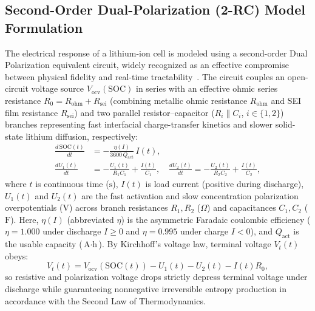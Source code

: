 \documentclass[10pt,a4paper]{article}
\begin{document}
\subsection{Second-Order Dual-Polarization (2-RC) Model Formulation}
The electrical response of a lithium-ion cell is modeled using a second-order Dual Polarization equivalent circuit, widely recognized as an effective compromise between physical fidelity and real-time tractability~\cite{Hu2012ecm,Xiong2014}. The circuit couples an open-circuit voltage source $V_{\text{ocv}}(\text{SOC})$ in series with an effective ohmic series resistance $R_0 = R_{\text{ohm}} + R_{\text{sei}}$ (combining metallic ohmic resistance $R_{\text{ohm}}$ and SEI film resistance $R_{\text{sei}}$) and two parallel resistor--capacitor ($R_i \parallel C_i$, $i \in \{1, 2\}$) branches representing fast interfacial charge-transfer kinetics and slower solid-state lithium diffusion, respectively:
\begin{align}
\frac{d\,\text{SOC}(t)}{dt} &= -\frac{\eta(I)}{3600\,Q_{\text{act}}}\,I(t), \label{eqn:soc_diff}\\
\frac{d U_1(t)}{dt} &= -\frac{U_1(t)}{R_1 C_1} + \frac{I(t)}{C_1}, \quad \frac{d U_2(t)}{dt} = -\frac{U_2(t)}{R_2 C_2} + \frac{I(t)}{C_2}, \label{eqn:u12_diff}
\end{align}
where $t$ is continuous time ($\text{s}$), $I(t)$ is load current (positive during discharge), $U_1(t)$ and $U_2(t)$ are the fast activation and slow concentration polarization overpotentials ($\text{V}$) across branch resistances $R_1, R_2$ ($\Omega$) and capacitances $C_1, C_2$ ($\text{F}$). Here, $\eta(I)$ (abbreviated $\eta$) is the asymmetric Faradaic coulombic efficiency ($\eta = 1.000$ under discharge $I \ge 0$ and $\eta = 0.995$ under charge $I < 0$), and $Q_{\text{act}}$ is the usable capacity ($\text{A}\cdot\text{h}$). By Kirchhoff's voltage law, terminal voltage $V_t(t)$ obeys:
\begin{equation}\label{eqn:vt_diff}
V_t(t) = V_{\text{ocv}}(\text{SOC}(t)) - U_1(t) - U_2(t) - I(t) R_0,
\end{equation}
so resistive and polarization voltage drops strictly depress terminal voltage under discharge while guaranteeing nonnegative irreversible entropy production in accordance with the Second Law of Thermodynamics.
\end{document}
